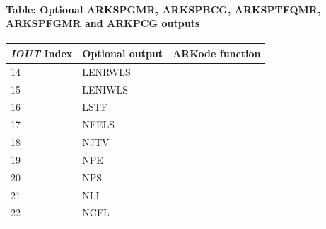 \documentclass[letterpaper,10pt,english]{sphinxmanual}
\begin{document}
\paragraph{Table: Optional ARKSPGMR, ARKSPBCG, ARKSPTFQMR, ARKSPFGMR and ARKPCG outputs}
\label{f_interface/Optional_output:table-optional-arkspgmr-arkspbcg-arksptfqmr-arkspfgmr-and-arkpcg-outputs}\label{f_interface/Optional_output:finterface-spilsiouttable}
\begin{tabulary}{\linewidth}{|L|L|L|}
\hline
\textbf{\relax 
\emph{IOUT} Index
} & \textbf{\relax 
Optional output
} & \textbf{\relax 
ARKode function
}\\\hline

14
 & 
LENRWLS
 & 
{\hyperref[c_interface/User_callable:ARKSpilsGetWorkSpace]{}}
\\\hline

15
 & 
LENIWLS
 & 
{\hyperref[c_interface/User_callable:ARKSpilsGetWorkSpace]{}}
\\\hline

16
 & 
LSTF
 & 
{\hyperref[c_interface/User_callable:ARKSpilsGetLastFlag]{}}
\\\hline

17
 & 
NFELS
 & 
{\hyperref[c_interface/User_callable:ARKSpilsGetNumRhsEvals]{}}
\\\hline

18
 & 
NJTV
 & 
{\hyperref[c_interface/User_callable:ARKSpilsGetNumJtimesEvals]{}}
\\\hline

19
 & 
NPE
 & 
{\hyperref[c_interface/User_callable:ARKSpilsGetNumPrecEvals]{}}
\\\hline

20
 & 
NPS
 & 
{\hyperref[c_interface/User_callable:ARKSpilsGetNumPrecSolves]{}}
\\\hline

21
 & 
NLI
 & 
{\hyperref[c_interface/User_callable:ARKSpilsGetNumLinIters]{}}
\\\hline

22
 & 
NCFL
 & 
{\hyperref[c_interface/User_callable:ARKSpilsGetNumConvFails]{}}
\\\hline
\end{tabulary}
\end{document}
